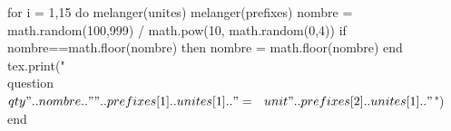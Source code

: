 \documentclass[../Cours.tex]{subfiles}
\begin{document}
\begin{questions}
\begin{multicols}{3}
\begin{luacode}
            for i = 1,15 
            do
                melanger(unites)
                melanger(prefixes)
                nombre = math.random(100,999) / math.pow(10, math.random(0,4))
                if nombre==math.floor(nombre) then nombre = math.floor(nombre) end
                tex.print("\\question $\\qty{" .. nombre .. "}{" .. prefixes[1] .. unites[1] .. "} = ~~~\\unit{" .. prefixes[2] .. unites[1] .. "}$") 
            end
        \end{luacode}
        \end{multicols}
\end{questions}
\end{document}
